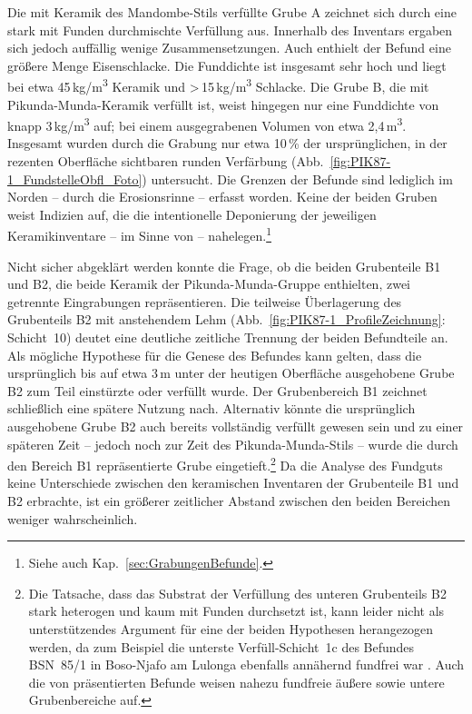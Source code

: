 Die mit Keramik des Mandombe-Stils verfüllte Grube A zeichnet sich durch eine stark mit Funden durchmischte Verfüllung aus. Innerhalb des Inventars ergaben sich jedoch auffällig wenige Zusammensetzungen. Auch enthielt der Befund eine größere Menge Eisenschlacke. Die Funddichte ist insgesamt sehr hoch und liegt bei etwa 45\,kg/m\textsuperscript{3} Keramik und \textgreater\,15\,kg/m\textsuperscript{3} Schlacke. Die Grube B, die mit Pikunda-Munda-Keramik verfüllt ist, weist hingegen nur eine Funddichte von knapp 3\,kg/m\textsuperscript{3} auf; bei einem ausgegrabenen Volumen von etwa 2,4\,m\textsuperscript{3}. Insgesamt wurden durch die Grabung nur etwa 10\,\% der ursprünglichen, in der rezenten Oberfläche sichtbaren runden Verfärbung (Abb.~\ref{fig:PIK87-1_FundstelleObfl_Foto}) untersucht. Die Grenzen der Befunde sind lediglich im Norden -- durch die Erosionsrinne -- erfasst worden. Keine der beiden Gruben weist Indizien auf, die die intentionelle Deponierung der jeweiligen Keramikinventare -- im Sinne von \textcite{Wotzka.1993} -- nahelegen.\footnote{Siehe auch Kap.~\ref{sec:GrabungenBefunde}.}

Nicht sicher abgeklärt werden konnte die Frage, ob die beiden Grubenteile B1 und B2, die beide Keramik der Pikunda-Munda-Gruppe enthielten, zwei getrennte Eingrabungen repräsentieren. Die teilweise Überlagerung des Grubenteils B2 mit anstehendem Lehm (Abb.~\ref{fig:PIK87-1_ProfileZeichnung}: Schicht~10) deutet eine deutliche zeitliche Trennung der beiden Befundteile an. Als mögliche Hypothese für die Genese des Befundes kann gelten, dass die ursprünglich bis auf etwa 3\,m unter der heutigen Oberfläche ausgehobene Grube B2 zum Teil einstürzte oder verfüllt wurde. Der Grubenbereich B1 zeichnet schließlich eine spätere Nutzung nach. Alternativ könnte die ursprünglich ausgehobene Grube B2 auch bereits vollständig verfüllt gewesen sein und zu einer späteren Zeit -- jedoch noch zur Zeit des Pikunda-Munda-Stils -- wurde die durch den Bereich B1 repräsentierte Grube eingetieft.\footnote{Die Tatsache, dass das Substrat der Verfüllung des unteren Grubenteils B2 stark heterogen und kaum mit Funden durchsetzt ist, kann leider nicht als unterstützendes Argument für eine der beiden Hypothesen herangezogen werden, da zum Beispiel die unterste Verfüll-Schicht~1c des Befundes BSN~85/1 in Boso-Njafo am Lulonga ebenfalls annähernd fundfrei war \parencites[382--386]{Wotzka.1995}. Auch die von \textcite[5 Abb.~3, 6 Abb.~5]{LivingstoneSmith.2017} präsentierten Befunde weisen nahezu fundfreie äußere sowie untere Grubenbereiche auf.} Da die Analyse des Fundguts keine Unterschiede zwischen den keramischen Inventaren der Grubenteile B1 und B2 erbrachte, ist ein größerer zeitlicher Abstand zwischen den beiden Bereichen weniger wahrscheinlich.